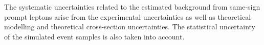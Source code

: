 The systematic uncertainties related to the estimated background from same-sign prompt leptons arise from the experimental uncertainties 
as well as theoretical modelling and theoretical cross-section uncertainties.
The statistical uncertainty of the simulated event samples is also taken into account.
